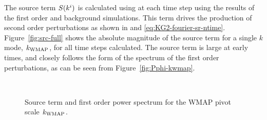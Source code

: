The source term $S(k^i)$ is calculated using  at each time
step using the results of the first order and background simulations. This term
drives the production of second order perturbations as shown in
 and
\eqref{eq:KG2-fourier-sr-ntime}. Figure~\ref{fig:src-full} shows the
absolute magnitude of the source term for a single $k$ mode, $\kwmap$,
for all time steps calculated. 
The source term is large at early times, and closely follows the form
of the spectrum of the first order perturbations, as can be seen from
Figure~\ref{fig:Pphi-kwmap}.
% 
\begin{figure}[htbp]
\centering
{}\\
% 
\caption[Source Term and First Order Power Spectrum for $\kwmap$]{Source term and 
first order power spectrum for the WMAP pivot scale $\kwmap$.}
\end{figure}
